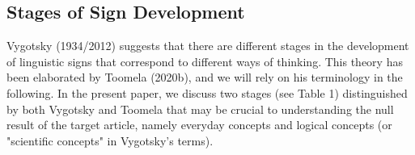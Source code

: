 \documentclass[authordate, reflection, issue]{jote-new-article}
\begin{document}
	\subsection{Stages of Sign Development}



	Vygotsky (1934/2012) suggests that there are different stages in the development of linguistic signs that correspond to different ways of thinking. This theory has been elaborated by Toomela (2020b), and we will rely on his terminology in the following. In the present paper, we discuss two stages (see Table 1) distinguished by both Vygotsky and Toomela that may be crucial to understanding the null result of the target article, namely everyday concepts and logical concepts (or "scientific concepts" in Vygotsky's terms).
\end{document}
